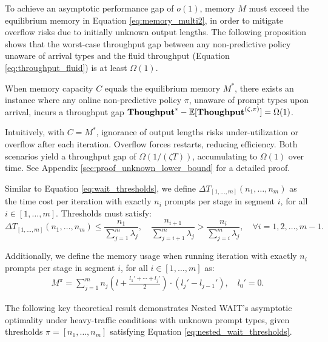To achieve an asymptotic performance gap of \( o(1) \), memory \( M \) must exceed the equilibrium memory in Equation \eqref{eq:memory_multi2}, in order to mitigate overflow risks due to initially unknown output lengths. The following proposition shows that the worst-case throughput gap between any non-predictive policy unaware of arrival types and the fluid throughput (Equation \eqref{eq:throughput_fluid}) is at least \( \Omega(1) \).

\begin{proposition}
\label{prop:unknown_lower_bound}
When memory capacity \( C \) equals the equilibrium memory \( M^* \), there exists an instance where any online non-predictive policy \( \pi \), unaware of prompt types upon arrival, incurs a throughput gap \( \textbf{Thoughput}^* - \mathbb{E}[\textbf{Thoughput}^{(\zeta, \pi)}] = \Omega(1) \).
\end{proposition}

Intuitively, with \( C = M^* \), ignorance of output lengths risks under-utilization or overflow after each iteration. Overflow forces restarts, reducing efficiency. Both scenarios yield a throughput gap of \( \Omega(1 / (\zeta T)) \), accumulating to \( \Omega(1) \) over time. See Appendix \ref{sec:proof_unknown_lower_bound} for a detailed proof.



Similar to Equation \eqref{eq:wait_thresholds}, we define \( \Delta T_{[1,\dots,m]}(n_1, \dots, n_m) \) as the time cost per iteration with exactly \( n_i \) prompts per stage in segment \( i \), for all \( i \in [1, \dots, m] \). Thresholds must satisfy:
\begin{equation}
    \label{eq:nested_wait_thresholds}
    \Delta T_{[1,\dots,m]}(n_1, \dots, n_m) \leq \frac{n_1}{\sum_{j=1}^m \lambda_j}, \quad \frac{n_{i+1}}{\sum_{j=i+1}^m \lambda_j} > \frac{n_i}{\sum_{j=i}^m \lambda_j}, \quad \forall i = 1, 2, \dots, m-1.
\end{equation}

Additionally, we define the memory usage when running iteration with exactly \( n_i \) prompts per stage in segment \( i \), for all \( i \in [1, \dots, m] \) as:
\begin{align}
    \label{eq:nested_wait_memory}
    M^\pi = \sum_{j=1}^m n_j \left( l + \frac{l_1' + \cdots + l_j'}{2} \right) \cdot (l_j' - l_{j-1}'), \quad l_0' = 0.
\end{align}

The following key theoretical result demonstrates Nested WAIT’s asymptotic optimality under heavy-traffic conditions with unknown prompt types, given thresholds \( \pi = [n_1, \dots, n_m] \) satisfying Equation \eqref{eq:nested_wait_thresholds}.

